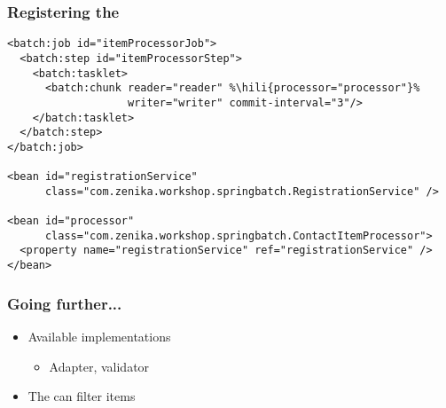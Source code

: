 \begin{frame}[fragile]
\frametitle{Registering the }
\lstset{language=XML}
\begin{lstlisting}
<batch:job id="itemProcessorJob">
  <batch:step id="itemProcessorStep">
    <batch:tasklet>
      <batch:chunk reader="reader" %\hili{processor="processor"}% 
                   writer="writer" commit-interval="3"/>
    </batch:tasklet>
  </batch:step>
</batch:job>

<bean id="registrationService"
      class="com.zenika.workshop.springbatch.RegistrationService" />

<bean id="processor"
      class="com.zenika.workshop.springbatch.ContactItemProcessor">
  <property name="registrationService" ref="registrationService" />
</bean>
\end{lstlisting}
\end{frame}

\begin{frame}
 \frametitle{Going further...}
 \begin{itemize}
  \item Available  implementations
  \begin{itemize}
    \item Adapter, validator
  \end{itemize}
  \item The  can filter items
 \end{itemize}
\end{frame}

